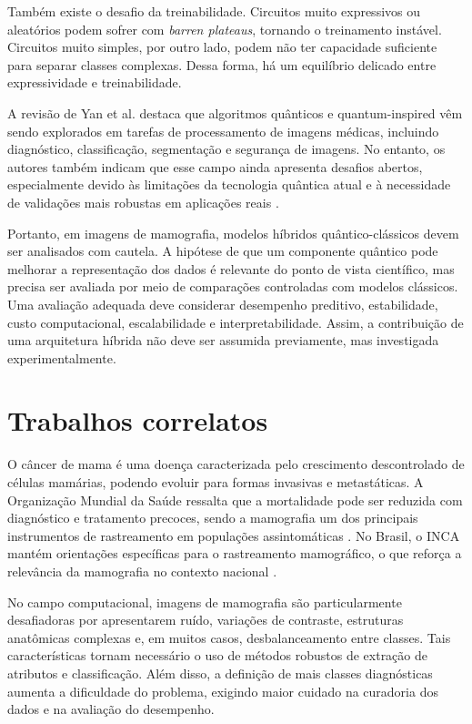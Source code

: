 \documentclass[
    12pt,
    openright,
    oneside,
    a4paper,
    english,
    brazil
]{abntex2}
\begin{document}
Também existe o desafio da treinabilidade. Circuitos muito expressivos ou aleatórios podem sofrer com \textit{barren plateaus}, tornando o treinamento instável. Circuitos muito simples, por outro lado, podem não ter capacidade suficiente para separar classes complexas. Dessa forma, há um equilíbrio delicado entre expressividade e treinabilidade.

A revisão de Yan et al. destaca que algoritmos quânticos e quantum-inspired vêm sendo explorados em tarefas de processamento de imagens médicas, incluindo diagnóstico, classificação, segmentação e segurança de imagens. No entanto, os autores também indicam que esse campo ainda apresenta desafios abertos, especialmente devido às limitações da tecnologia quântica atual e à necessidade de validações mais robustas em aplicações reais \cite{yan2024quantumMedicalImageReview}.

Portanto, em imagens de mamografia, modelos híbridos quântico-clássicos devem ser analisados com cautela. A hipótese de que um componente quântico pode melhorar a representação dos dados é relevante do ponto de vista científico, mas precisa ser avaliada por meio de comparações controladas com modelos clássicos. Uma avaliação adequada deve considerar desempenho preditivo, estabilidade, custo computacional, escalabilidade e interpretabilidade. Assim, a contribuição de uma arquitetura híbrida não deve ser assumida previamente, mas investigada experimentalmente.

\section{Trabalhos correlatos}

O câncer de mama é uma doença caracterizada pelo crescimento descontrolado de células mamárias, podendo evoluir para formas invasivas e metastáticas. A Organização Mundial da Saúde ressalta que a mortalidade pode ser reduzida com diagnóstico e tratamento precoces, sendo a mamografia um dos principais instrumentos de rastreamento em populações assintomáticas \cite{WHO2026BreastCancer}. No Brasil, o INCA mantém orientações específicas para o rastreamento mamográfico, o que reforça a relevância da mamografia no contexto nacional \cite{INCA2025Rastreamento}.

No campo computacional, imagens de mamografia são particularmente desafiadoras por apresentarem ruído, variações de contraste, estruturas anatômicas complexas e, em muitos casos, desbalanceamento entre classes. Tais características tornam necessário o uso de métodos robustos de extração de atributos e classificação. Além disso, a definição de mais classes diagnósticas aumenta a dificuldade do problema, exigindo maior cuidado na curadoria dos dados e na avaliação do desempenho.
\end{document}
